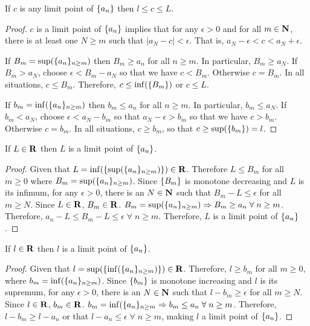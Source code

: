 \begin{lem}\label{c5s4l8}
If $c$ is any limit point of $\{a_n\}$ then $l \le c \le L$.
\end{lem}
\begin{proof}
$c$ is a limit point of $\{a_n\}$ implies that for any $\epsilon > 0$ 
and for all $m \in \mathbf{N}$, there is at least one $N \ge m$ such that $|a_N
- c| < \epsilon$. That is, $a_N - \epsilon < c < a_N + \epsilon$. 

If $B_m = \sup(\{a_n\}_{n \ge m})$ then $B_m \ge a_n$ for all $n \ge m$. 
In particular, $B_m \ge a_N$. If $B_m > a_N$, choose $\epsilon < B_m - a_N$
so that we have $c < B_m$. Otherwise $c = B_m$. In all situations, $c 
\le B_m$. Therefore, $c \le \inf(\{B_m\})$ or $c \le L$.

If $b_m = \inf(\{a_n\}_{n \ge m})$ then $b_m \le a_n$ for all $n \ge m$.
In particular, $b_m \le a_N$. If $b_m < a_N$, choose $\epsilon < a_N - b_m$
so that $a_N - \epsilon > b_m$ so that we have $c > b_m$. Otherwise $c = 
b_m$. In all situations, $c \ge b_m$, so that $c \ge \sup(\{b_m\}) = l$.
\end{proof}

\begin{lem}\label{c5s4l9}
If $L \in \mathbf{R}$ then $L$ is a limit point of $\{a_n\}$.
\end{lem}
\begin{proof}
Given that $L = \inf(\{\sup(\{a_n\}_{n \ge m})\}) \in \mathbf{R}$. Therefore
$L \le B_m$ for all $m \ge 0$ where $B_m = \sup(\{a_n\}_{n \ge m})$. Since
$\{B_m\}$ is monotone decreasing and $L$ is its infimum, for any $\epsilon
> 0$, there is an $N \in \mathbf{N}$ such that $B_m - L \le \epsilon$ for all 
$m \ge N$. Since $L \in \mathbf{R}$, $B_m \in \mathbf{R}$. $B_m = \sup(\{a_n\}_
{n \ge m}) \Rightarrow B_m \ge a_n \;\forall\; n \ge m$. Therefore, $a_n -
L \le B_m - L \le \epsilon \;\forall\; n \ge m$. Therefore, $L$ is a limit
point of $\{a_n\}$.
\end{proof}

\begin{lem}\label{c5s4l10}
If $l \in \mathbf{R}$ then $l$ is a limit point of $\{a_n\}$.
\end{lem}
\begin{proof}
Given that $l = \sup(\{\inf(\{a_n\}_{n \ge m})\}) \in \mathbf{R}$. Therefore,
$l \ge b_m$ for all $m \ge 0$, where $b_m = \inf(\{a_n\}_{n \ge m})$. Since
$\{b_m\}$ is monotone increasing and $l$ is its supremum, for any $\epsilon
> 0$, there is an $N \in \mathbf{N}$ such that $l - b_m \ge \epsilon$ for all
$m \ge N$. Since $l \in \mathbf{R}$, $b_m \in \mathbf{R}$. $b_m = \inf(\{a_n\}_
{n \ge m} \Rightarrow b_m \le a_n \;\forall\; n \ge m$. Therefore, $l - b_m
\ge l - a_n$ or that $l - a_n \le \epsilon \;\forall\; n \ge m$, making $l$
a limit point of $\{a_n\}$.
\end{proof}

